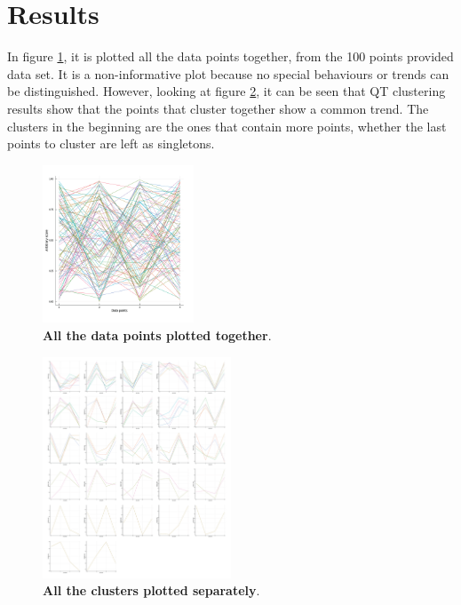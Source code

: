 \section*{Results}

In figure \ref{fig:all}, it is plotted all the data points together, from the 100 points provided data set. It is a non-informative plot because no special behaviours or trends can be distinguished. However, looking at figure \ref{fig:clusters}, it can be seen that QT clustering results show that the points that cluster together show a common trend. The clusters in the beginning are the ones that contain more points, whether the last points to cluster are left as singletons. \\ 
\begin{figure}[h]
    \centering
    \includegraphics[width=0.4\textwidth]{images/myplot_initial.png}
    \caption{\textbf{All the data points plotted together}.}
    \label{fig:all}
\end{figure} 
\begin{figure}[h]
    \centering
    \includegraphics[width=0.5\textwidth]{images/clusters_separate.png}
    \caption{\textbf{All the clusters plotted separately}.}
    \label{fig:clusters}
\end{figure}

